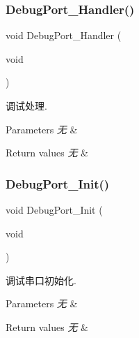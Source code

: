 \subsubsection{\texorpdfstring{Debug\+Port\+\_\+\+Handler()}{DebugPort\_Handler()}}
{\footnotesize\ttfamily void Debug\+Port\+\_\+\+Handler (\begin{DoxyParamCaption}\item[{void}]{ }\end{DoxyParamCaption})}



调试处理. 


\begin{DoxyParams}{Parameters}
{\em 无} & \\
\hline
\end{DoxyParams}

\begin{DoxyRetVals}{Return values}
{\em 无} & \\
\hline
\end{DoxyRetVals}
\mbox{\label{group___debug_port_gac8b6f2276832297b953b0df9c9b9c94f}} 
\subsubsection{\texorpdfstring{Debug\+Port\+\_\+\+Init()}{DebugPort\_Init()}}
{\footnotesize\ttfamily void Debug\+Port\+\_\+\+Init (\begin{DoxyParamCaption}\item[{void}]{ }\end{DoxyParamCaption})}



调试串口初始化. 


\begin{DoxyParams}{Parameters}
{\em 无} & \\
\hline
\end{DoxyParams}

\begin{DoxyRetVals}{Return values}
{\em 无} & \\
\hline
\end{DoxyRetVals}
\mbox{\label{group___debug_port_gaf512b658a5c59c2cf06838a46fb566a6}} 
